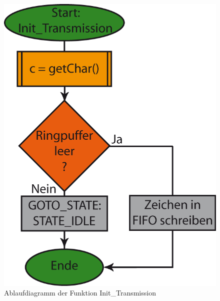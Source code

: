 \begin{figure}[h]
\includegraphics[scale = 0.8]{./Init_Transmission.png}
\hspace{-14pt}
\caption{Ablaufdiagramm der Funktion Init\_Transmission}
\end{figure} 


